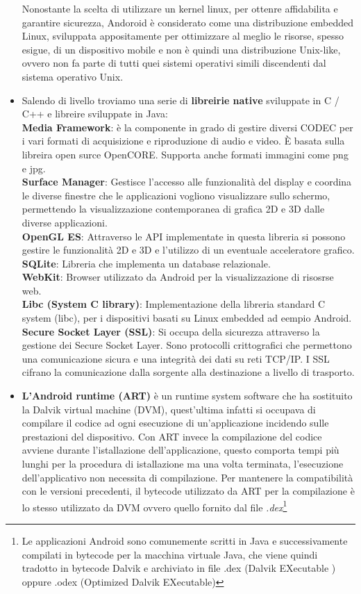 \begin{itemize}
Nonostante la scelta di utilizzare un kernel linux, per ottenre affidabilita e garantire sicurezza, Andoroid è considerato come una distribuzione embedded Linux, sviluppata appositamente per ottimizzare al meglio le risorse, spesso esigue, di un dispositivo mobile e non è quindi una distribuzione Unix-like, ovvero non fa parte di tutti quei sistemi operativi simili discendenti dal sistema operativo Unix. 
\item Salendo di livello troviamo una serie di \textbf{libreirie native} sviluppate in C / C++ e libreire sviluppate in Java: 
\\\textbf{Media Framework}: è la componente in grado di gestire diversi CODEC per i vari formati di acquisizione e riproduzione di audio e video. È basata sulla libreira open surce OpenCORE. Supporta anche formati immagini come png e jpg. 
\\\textbf{Surface Manager}: Gestisce l’accesso alle funzionalità del display e coordina le diverse finestre che le applicazioni vogliono visualizzare sullo schermo, permettendo la visualizzazione contemporanea di grafica 2D e 3D dalle diverse applicazioni.
\\\textbf{OpenGL ES}: Attraverso le API implementate in questa libreria si possono gestire le funzionalità 2D e 3D e l'utilizzo di un eventuale acceleratore grafico. 
\\\textbf{SQLite}: Libreria che implementa un database relazionale.
\\\textbf{WebKit}: Browser utilizzato da Android per la visualizzazione di risosrse web. 
\\\textbf{Libc (System C library)}: Implementazione della libreria standard C system (libc), per i dispositivi basati su Linux embedded ad eempio Android.
\\\textbf{Secure Socket Layer (SSL)}: Si occupa della sicurezza attraverso la gestione dei Secure Socket Layer. Sono protocolli crittografici che permettono una comunicazione sicura e una integrità dei dati su reti TCP/IP. I SSL cifrano la comunicazione dalla sorgente alla destinazione a livello di trasporto.
\item \textbf{L'Android runtime (ART)} è un runtime system software che ha sostituito la Dalvik virtual machine (DVM), quest'ultima infatti si occupava di compilare il codice ad ogni esecuzione di un'applicazione incidendo sulle prestazioni del dispositivo. Con ART invece la compilazione del codice avviene durante l'istallazione dell'applicazione, questo comporta tempi più lunghi per la procedura di istallazione ma una volta terminata, l'esecuzione dell'applicativo non necessita di compilazione. Per mantenere la compatibilità con le versioni precedenti, il bytecode utilizzato da ART per la compilazione è lo stesso utilizzato da DVM ovvero quello fornito dal file \textit{.dex}\footnote{Le applicazioni Android sono comunemente scritti in Java e successivamente compilati in bytecode per la macchina virtuale Java, che viene quindi tradotto in bytecode Dalvik e archiviato in file .dex (Dalvik EXecutable ) oppure .odex (Optimized Dalvik EXecutable)}

\end{itemize}
